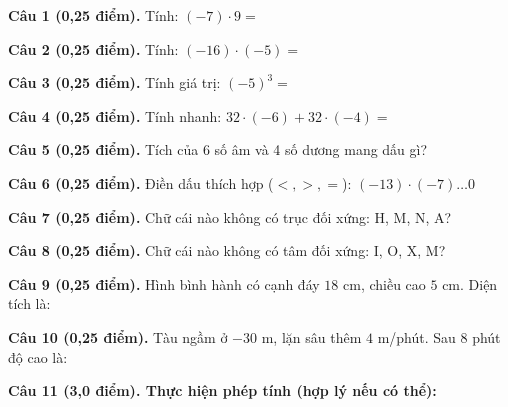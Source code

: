 \documentclass[12pt,a4paper]{article}
\begin{document}
\vspace{1.0mm}
\noindent\textbf{Câu 1 (0,25 điểm).} Tính: $(-7) \cdot 9 =$ \par\vspace{0.25mm}
\noindent\textbf{Câu 2 (0,25 điểm).} Tính: $(-16) \cdot (-5) =$ \par\vspace{0.25mm}
\noindent\textbf{Câu 3 (0,25 điểm).} Tính giá trị: $(-5)^3 =$ \par\vspace{0.25mm}
\noindent\textbf{Câu 4 (0,25 điểm).} Tính nhanh: $32 \cdot (-6) + 32 \cdot (-4) =$ \par\vspace{0.25mm}
\noindent\textbf{Câu 5 (0,25 điểm).} Tích của 6 số âm và 4 số dương mang dấu gì? \par\vspace{0.25mm}
\noindent\textbf{Câu 6 (0,25 điểm).} Điền dấu thích hợp ($<, >, =$): $(-13) \cdot (-7) \dots 0$ \shortans{>}\par\vspace{0.25mm}
\noindent\textbf{Câu 7 (0,25 điểm).} Chữ cái nào không có trục đối xứng: H, M, N, A? \par\vspace{0.25mm}
\noindent\textbf{Câu 8 (0,25 điểm).} Chữ cái nào không có tâm đối xứng: I, O, X, M? \par\vspace{0.25mm}
\noindent\textbf{Câu 9 (0,25 điểm).} Hình bình hành có cạnh đáy $18\text{ cm}$, chiều cao $5\text{ cm}$. Diện tích là: \par\vspace{0.25mm}
\noindent\textbf{Câu 10 (0,25 điểm).} Tàu ngầm ở $-30\text{ m}$, lặn sâu thêm $4\text{ m}$/phút. Sau 8 phút độ cao là: \par\vspace{0.25mm}

\vspace{0.3mm}
\noindent\textbf{Câu 11 (3,0 điểm). Thực hiện phép tính (hợp lý nếu có thể):}
\vspace{0.4mm}
\end{document}
